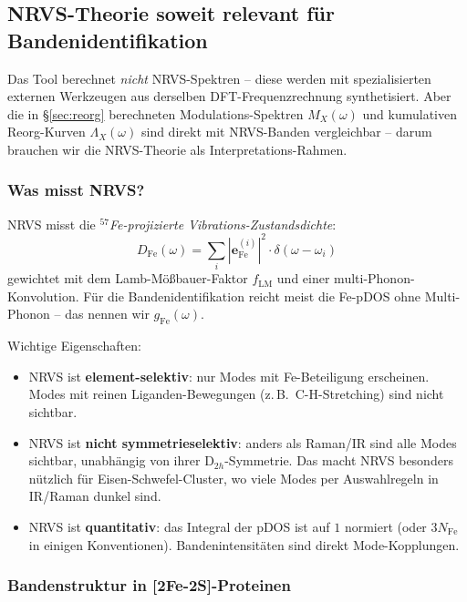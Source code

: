 \documentclass[11pt,a4paper,twoside]{article}
\theoremstyle{remark}
\begin{document}
\subsection{NRVS-Theorie soweit relevant f\"ur Bandenidentifikation}
\label{sec:nrvs}

Das Tool berechnet \emph{nicht} NRVS-Spektren -- diese werden mit
spezialisierten externen Werkzeugen aus derselben DFT-Frequenzrechnung
synthetisiert. Aber die in
\S\ref{sec:reorg} berechneten Modulations-Spektren $M_X(\omega)$ und
kumulativen Reorg-Kurven $\Lambda_X(\omega)$ sind direkt mit
NRVS-Banden vergleichbar -- darum brauchen wir die NRVS-Theorie als
Interpretations-Rahmen.

\subsubsection*{Was misst NRVS?}

NRVS \cite{Sturhahn2004} misst die
\emph{$^{57}$Fe-projizierte Vibrations-Zustandsdichte}:
\begin{equation}
  D_\text{Fe}(\omega) = \sum_i |\mathbf{e}_\text{Fe}^{(i)}|^2 \cdot
                          \delta(\omega - \omega_i)
  \label{eq:fe-pdos}
\end{equation}
gewichtet mit dem Lamb-M\"o{\ss}bauer-Faktor $f_\text{LM}$ und einer
multi-Phonon-Konvolution. F\"ur die Bandenidentifikation reicht meist
die Fe-pDOS ohne Multi-Phonon -- das nennen wir $g_\text{Fe}(\omega)$.

Wichtige Eigenschaften:
\begin{itemize}\setlength{\itemsep}{0pt}
  \item NRVS ist \textbf{element-selektiv}: nur Modes mit
        Fe-Beteiligung erscheinen. Modes mit reinen Liganden-Bewegungen
        (z.\,B.\ C-H-Stretching) sind nicht sichtbar.
  \item NRVS ist \textbf{nicht symmetrieselektiv}: anders als
        Raman/IR sind alle Modes sichtbar, unabh\"angig von ihrer
        D$_{2h}$-Symmetrie. Das macht NRVS besonders n\"utzlich f\"ur
        Eisen-Schwefel-Cluster, wo viele Modes per
        Auswahlregeln in IR/Raman dunkel sind.
  \item NRVS ist \textbf{quantitativ}: das Integral der pDOS ist auf
        $1$ normiert (oder $3 N_\text{Fe}$ in einigen
        Konventionen). Bandenintensit\"aten sind direkt
        Mode-Kopplungen.
\end{itemize}

\subsubsection*{Bandenstruktur in [2Fe-2S]-Proteinen}
\end{document}
